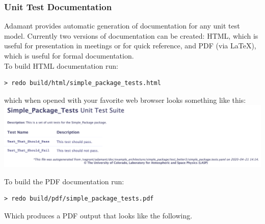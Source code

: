 \subsubsection{Unit Test Documentation} \label{Unit Test Documentation}

Adamant provides automatic generation of documentation for any unit test model. Currently two versions of documentation can be created: HTML, which is useful for presentation in meetings or for quick reference, and PDF (via \LaTeX), which is useful for formal documentation.\\

To build HTML documentation run:

\vspace{5mm} %
\begin{verbatim}
> redo build/html/simple_package_tests.html
\end{verbatim}
\vspace{5mm} %

which when opened with your favorite web browser looks something like this: \\

\vspace{5mm} %
\includegraphics[width=\textwidth]{images/uthtml.png}
\vspace{5mm} %

To build the PDF documentation run:

\vspace{5mm} %
\begin{verbatim}
> redo build/pdf/simple_package_tests.pdf
\end{verbatim}
\vspace{5mm} %

Which produces a PDF output that looks like the following. \\

\noindent\makebox[\linewidth]{\rule{\textwidth}{0.4pt}}

\noindent\makebox[\linewidth]{\rule{\textwidth}{0.4pt}}


